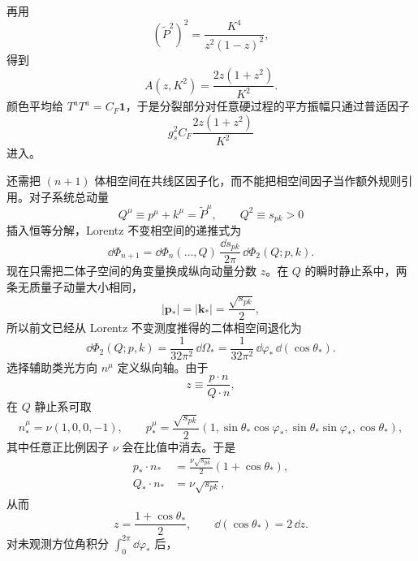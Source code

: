 \begin{derivation}
再用
\begin{equation*}
 (\widetilde P^2)^2
 =\frac{K^4}{z^2(1-z)^2},
\end{equation*}
得到
\begin{equation*}
 A(z,K^2)
 =\frac{2z(1+z^2)}{K^2}.
\end{equation*}
颜色平均给 $T^aT^a=C_F\mathbf1$，于是分裂部分对任意硬过程的平方振幅只通过普适因子
\begin{equation*}
 g_s^2C_F\frac{2z(1+z^2)}{K^2}
\end{equation*}
进入。

还需把 $(n+1)$ 体相空间在共线区因子化，而不能把相空间因子当作额外规则引用。对子系统总动量
\begin{equation*}
 Q^\mu\equiv p^\mu+k^\mu=\widetilde P^\mu,
 \qquad Q^2\equiv s_{pk}>0
\end{equation*}
插入恒等分解，Lorentz 不变相空间的递推式为
\begin{equation*}
 \dd\Phi_{n+1}
 =\dd\Phi_n(\ldots,Q)\,
 \frac{\dd s_{pk}}{2\pi}\,
 \dd\Phi_2(Q;p,k).
\end{equation*}
现在只需把二体子空间的角变量换成纵向动量分数 $z$。在 $Q$ 的瞬时静止系中，两条无质量子动量大小相同，
\begin{equation*}
 |\mathbf p_*|=|\mathbf k_*|=\frac{\sqrt{s_{pk}}}{2},
\end{equation*}
所以前文已经从 Lorentz 不变测度推得的二体相空间退化为
\begin{equation*}
 \dd\Phi_2(Q;p,k)
 =\frac{1}{32\pi^2}\,\dd\Omega_*
 =\frac{1}{32\pi^2}\,\dd\varphi_*\,\dd(\cos\theta_*).
\end{equation*}
选择辅助类光方向 $n^\mu$ 定义纵向轴。由于
\begin{equation*}
 z\equiv\frac{p\cdot n}{Q\cdot n},
\end{equation*}
在 $Q$ 静止系可取
\begin{equation*}
 n_*^\mu=\nu(1,0,0,-1),
 \qquad
 p_*^\mu=\frac{\sqrt{s_{pk}}}{2}
 (1,\sin\theta_*\cos\varphi_*,\sin\theta_*\sin\varphi_*,\cos\theta_*),
\end{equation*}
其中任意正比例因子 $\nu$ 会在比值中消去。于是
\begin{align*}
 p_*\cdot n_*
 &=\frac{\nu\sqrt{s_{pk}}}{2}(1+\cos\theta_*),\\
 Q_*\cdot n_*
 &=\nu\sqrt{s_{pk}},
\end{align*}
从而
\begin{equation*}
 z=\frac{1+\cos\theta_*}{2},
 \qquad
 \dd(\cos\theta_*)=2\,\dd z.
\end{equation*}
对未观测方位角积分 $\int_0^{2\pi}\dd\varphi_*$ 后，

\end{derivation}
